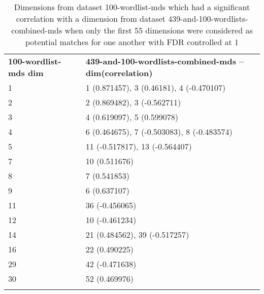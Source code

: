 \begin{longtable}[!htbp]{| ll |}\n    \hline
    \textbf{100-wordlist-mds dim} & \textbf{439-and-100-wordlists-combined-mds -- dim(correlation)}\\
    1 & 1 (0.871457), 3 (0.46181), 4 (-0.470107)\\
    2 & 2 (0.869482), 3 (-0.562711)\\
    3 & 4 (0.619097), 5 (0.599078)\\
    4 & 6 (0.464675), 7 (-0.503083), 8 (-0.483574)\\
    5 & 11 (-0.517817), 13 (-0.564407)\\
    7 & 10 (0.511676)\\
    8 & 7 (0.541853)\\
    9 & 6 (0.637107)\\
    11 & 36 (-0.456065)\\
    12 & 10 (-0.461234)\\
    14 & 21 (0.484562), 39 (-0.517257)\\
    16 & 22 (0.490225)\\
    29 & 42 (-0.471638)\\
    30 & 52 (0.469976)\\
    \hline
    \caption{Dimensions from dataset 100-wordlist-mds which had a significant correlation with a dimension from dataset 439-and-100-wordlists-combined-mds when only the first 55 dimensions were considered as potential matches for one another with FDR controlled at 1} \label{100-vs-439and100-from-800dim-lowercase-wmt-model-significant-first-55.tex}\\
\end{longtable}
